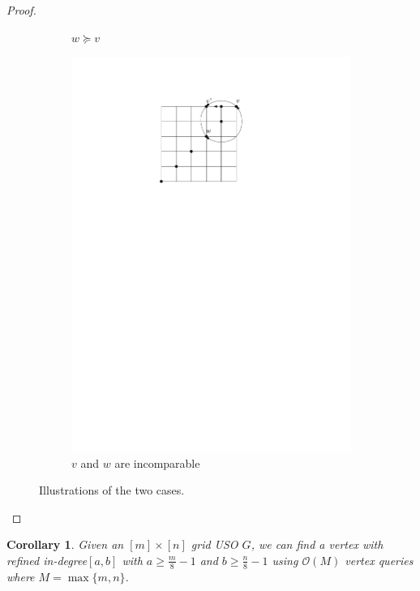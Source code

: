 \documentclass[a4paper,10pt]{article}
\newtheorem{corollary}{Corollary}
\newcommand{\indegree}{refined in-degree\xspace}
\begin{document}
\begin{proof}
\begin{figure}[htbp]
\begin{subfigure}[b]{0.4\textwidth}
           \caption{$w \succeq v$}
       \end{subfigure}
       \qquad \qquad
       \begin{subfigure}[b]{0.4\textwidth}
           \includegraphics[scale = 0.7]{seedlemma_fig2_cas2.pdf}
           \caption{$v$ and $w$ are incomparable}
       \end{subfigure}
       \caption{Illustrations of the two cases. }
       \label{fig:seedlem2}
   \end{figure}
\end{proof}

\begin{corollary}\label{corollary: n/4 indegree}
  Given an $[m]\times [n]$ grid USO $G$, we can find a vertex with \indegree $[a,b]$ with $a \geq \frac{m}{8} - 1$ and  $b \geq \frac{n}{8} - 1$ using $\mathcal{O}(M)$ vertex queries where $M = \max\{m,n\}$.
\end{corollary}
\end{document}
